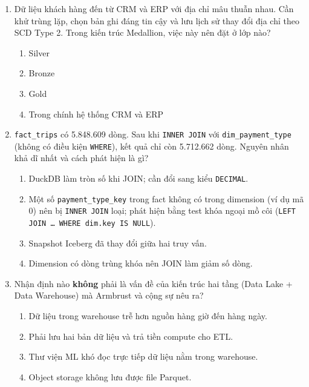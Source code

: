 \documentclass[12pt]{article}
\begin{document}
\begin{enumerate}[label=\textbf{\arabic*.}, leftmargin=1.6em, itemsep=1.2em]
\item Dữ liệu khách hàng đến từ CRM và ERP với địa chỉ mâu thuẫn nhau. Cần khử trùng lặp, chọn bản ghi đáng tin cậy và lưu lịch sử thay đổi địa chỉ theo SCD Type 2. Trong kiến trúc Medallion, việc này nên đặt ở lớp nào?

\begin{enumerate}[label=\alph*), leftmargin=2.2em, itemsep=1pt]
    \item Silver
    \item Bronze
    \item Gold
    \item Trong chính hệ thống CRM và ERP
\end{enumerate}

\item \texttt{fact\_trips} có 5.848.609 dòng. Sau khi \texttt{INNER JOIN} với \texttt{dim\_payment\_type} (không có điều kiện \texttt{WHERE}), kết quả chỉ còn 5.712.662 dòng. Nguyên nhân khả dĩ nhất và cách phát hiện là gì?

\begin{enumerate}[label=\alph*), leftmargin=2.2em, itemsep=1pt]
    \item DuckDB làm tròn số khi JOIN; cần đổi sang kiểu \texttt{DECIMAL}.
    \item Một số \texttt{payment\_type\_key} trong fact không có trong dimension (ví dụ mã 0) nên bị \texttt{INNER JOIN} loại; phát hiện bằng test khóa ngoại mồ côi (\texttt{LEFT JOIN \dots{} WHERE dim.key IS NULL}).
    \item Snapshot Iceberg đã thay đổi giữa hai truy vấn.
    \item Dimension có dòng trùng khóa nên JOIN làm giảm số dòng.
\end{enumerate}

\item Nhận định nào \textbf{không} phải là vấn đề của kiến trúc hai tầng (Data Lake + Data Warehouse) mà Armbrust và cộng sự nêu ra?

\begin{enumerate}[label=\alph*), leftmargin=2.2em, itemsep=1pt]
    \item Dữ liệu trong warehouse trễ hơn nguồn hàng giờ đến hàng ngày.
    \item Phải lưu hai bản dữ liệu và trả tiền compute cho ETL.
    \item Thư viện ML khó đọc trực tiếp dữ liệu nằm trong warehouse.
    \item Object storage không lưu được file Parquet.
\end{enumerate}

\end{enumerate}
\end{document}
